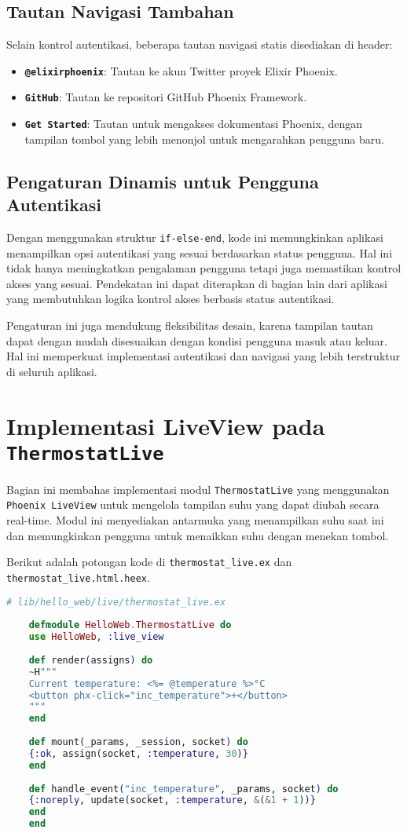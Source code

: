 \subsection{Tautan Navigasi Tambahan}
Selain kontrol autentikasi, beberapa tautan navigasi statis disediakan di header:
\begin{itemize}
	\item \textbf{\texttt{@elixirphoenix}}: Tautan ke akun Twitter proyek Elixir Phoenix.
	\item \textbf{\texttt{GitHub}}: Tautan ke repositori GitHub Phoenix Framework.
	\item \textbf{\texttt{Get Started}}: Tautan untuk mengakses dokumentasi Phoenix, dengan tampilan tombol yang lebih menonjol untuk mengarahkan pengguna baru.
\end{itemize}

\subsection{Pengaturan Dinamis untuk Pengguna Autentikasi}
Dengan menggunakan struktur \texttt{if-else-end}, kode ini memungkinkan aplikasi menampilkan opsi autentikasi yang sesuai berdasarkan status pengguna. Hal ini tidak hanya meningkatkan pengalaman pengguna tetapi juga memastikan kontrol akses yang sesuai. Pendekatan ini dapat diterapkan di bagian lain dari aplikasi yang membutuhkan logika kontrol akses berbasis status autentikasi.

Pengaturan ini juga mendukung fleksibilitas desain, karena tampilan tautan dapat dengan mudah disesuaikan dengan kondisi pengguna masuk atau keluar. Hal ini memperkuat implementasi autentikasi dan navigasi yang lebih terstruktur di seluruh aplikasi.

\section{Implementasi LiveView pada \texttt{ThermostatLive}}

Bagian ini membahas implementasi modul \texttt{ThermostatLive} yang menggunakan \texttt{Phoenix LiveView} untuk mengelola tampilan suhu yang dapat diubah secara real-time. Modul ini menyediakan antarmuka yang menampilkan suhu saat ini dan memungkinkan pengguna untuk menaikkan suhu dengan menekan tombol.

Berikut adalah potongan kode di \texttt{thermostat\_live.ex} dan \texttt{thermostat\_live.html.heex}.

\begin{lstlisting}[language=Elixir]
	# lib/hello_web/live/thermostat_live.ex
	
	defmodule HelloWeb.ThermostatLive do
	use HelloWeb, :live_view
	
	def render(assigns) do
	~H"""
	Current temperature: <%= @temperature %>°C
	<button phx-click="inc_temperature">+</button>
	"""
	end
	
	def mount(_params, _session, socket) do
	{:ok, assign(socket, :temperature, 30)}
	end
	
	def handle_event("inc_temperature", _params, socket) do
	{:noreply, update(socket, :temperature, &(&1 + 1))}
	end
	end
\end{lstlisting}

